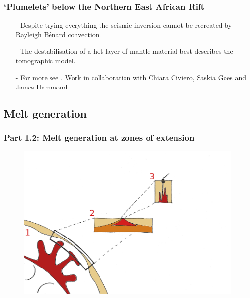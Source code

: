 \documentclass[aspectratio=169]{beamer}
\begin{document}
\begin{frame}
    \frametitle{`Plumelets' below the Northern East African Rift}
    \begin{itemize}
    \item[-]{Despite trying everything the seismic inversion cannot be recreated by Rayleigh B{\'e}nard convection.}
    \item[-]{The destabilisation of a hot layer of mantle material best describes the tomographic model.}
    \item[-]{For more see \cite{civiero-etal-2020}. Work in collaboration with Chiara Civiero, Saskia Goes and James Hammond.}
    \end{itemize}
\end{frame}

\subsection{Melt generation}

\begin{frame}
    \frametitle{Part 1.2: Melt generation at zones of extension}
    \begin{figure}
        \includegraphics[height=0.9\paperheight]{./pictures/drawing.png}
    \end{figure}
\end{frame}
\end{document}
